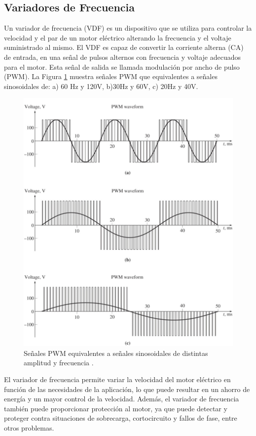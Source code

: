 \subsection{Variadores de Frecuencia}

Un variador de frecuencia (VDF) es un dispositivo que se utiliza para controlar la velocidad y el par de un motor eléctrico alterando la frecuencia y el voltaje suministrado al mismo. El VDF es capaz de convertir la corriente alterna (CA) de entrada, en una señal de pulsos alternos con frecuencia y voltaje adecuados para el motor. Esta señal de salida se llamada modulación por ancho de pulso (PWM). La Figura \ref{fig:pwm} muestra señales PWM que equivalentes a señales sinosoidales de: a) 60 Hz y 120V, b)30Hz y 60V, c) 20Hz y 40V.

\begin{figure}
	\centering
	\includegraphics[width=0.8\linewidth]{Imagenes/pwm2}
	\caption{Señales PWM equivalentes a señales sinosoidales de distintas amplitud y frecuencia \cite{Chapman12}.}
	\label{fig:pwm}
\end{figure}


El variador de frecuencia permite variar la velocidad del motor eléctrico en función de las necesidades de la aplicación, lo que puede resultar en un ahorro de energía y un mayor control de la velocidad. Además, el variador de frecuencia también puede proporcionar protección al motor, ya que puede detectar y proteger contra situaciones de sobrecarga, cortocircuito y fallos de fase, entre otros problemas.


